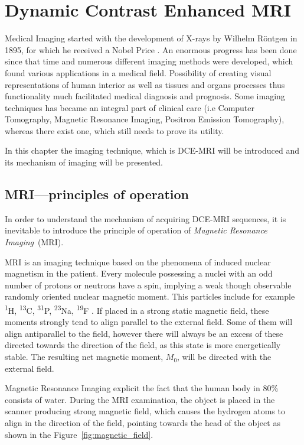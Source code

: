 \chapter{Dynamic Contrast Enhanced MRI}
	
Medical Imaging started with the development of X-rays by Wilhelm Röntgen in 1895, for which he received a Nobel Price \cite{rontgen1896new}. 
An enormous progress has been done since that time and numerous different imaging methods were developed, which found various applications in a medical field. Possibility of creating  visual representations of human interior as well as tissues and organs processes thus functionality much facilitated medical diagnosis and prognosis.   
Some imaging techniques has became an integral part of clinical care (i.e Computer Tomography, Magnetic Resonance Imaging, Positron Emission Tomography), whereas there exist one, which still needs to prove its utility. 

In this chapter the imaging technique, which is DCE-MRI will be introduced and its mechanism of imaging will be presented.

\section{MRI---principles of operation}
In order to understand the mechanism of acquiring DCE-MRI sequences, it is inevitable to introduce the principle of operation of \textit{Magnetic Resonance Imaging}~(MRI).

MRI is an imaging technique based on the phenomena of induced nuclear  magnetism in the patient. Every molecule possessing a nuclei with an odd number of protons or neutrons  have a spin, implying a weak though observable randomly oriented nuclear magnetic moment. 
This particles include for example \textsuperscript{1}H, \textsuperscript{13}C, \textsuperscript{31}P, \textsuperscript{23}Na, \textsuperscript{19}F \nocite{bronzino1999biomedical}\cite{biomedical_hanbook_imaging}. If placed in a strong static magnetic field, these moments strongly tend to align parallel to the external field. Some of them will align antiparallel to the field, however there will always be an excess of these directed towards the direction of the field, as this state is more energetically stable. The resulting net magnetic moment, $M_0$, will be directed with the external field.  

Magnetic Resonance Imaging explicit the fact that the human body in 80\% consists of water. During the MRI examination, the object is placed in the scanner producing strong magnetic field, which causes the hydrogen atoms to align in the direction of the field, pointing towards the head of the object as shown in the Figure~\ref{fig:magnetic_field}. 

